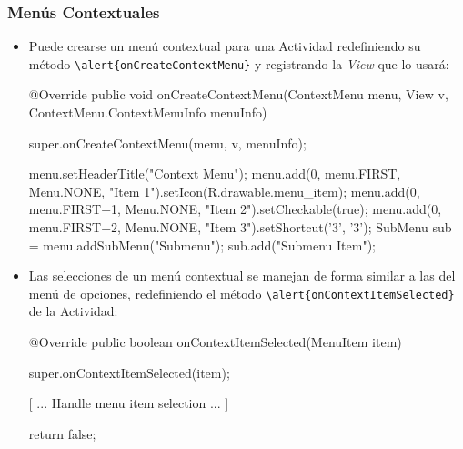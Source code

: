 \documentclass[hyperref={pdfpagelabels=true},ucs]{beamer}
\begin{document}
\begin{frame}[fragile, shrink=23]
\frametitle{Menús Contextuales}

\begin{itemize}

\item Puede crearse un menú contextual para una Actividad redefiniendo
  su método \Verb|\alert{onCreateContextMenu}| y registrando la
  \emph{View} que lo usará:

\begin{tiny}
\begin{block}{}
\begin{java}
@Override
public void onCreateContextMenu(ContextMenu menu, View v,
                                ContextMenu.ContextMenuInfo menuInfo) {
  super.onCreateContextMenu(menu, v, menuInfo);

  menu.setHeaderTitle("Context Menu");
  menu.add(0, menu.FIRST, Menu.NONE,
           "Item 1").setIcon(R.drawable.menu_item);
  menu.add(0, menu.FIRST+1, Menu.NONE, "Item 2").setCheckable(true);
  menu.add(0, menu.FIRST+2, Menu.NONE, "Item 3").setShortcut('3', '3');
  SubMenu sub = menu.addSubMenu("Submenu");
  sub.add("Submenu Item");
}
\end{java}
\end{block}
\end{tiny}

\item Las selecciones de un menú contextual se manejan de forma
  similar a las del menú de opciones, redefiniendo el método
  \Verb|\alert{onContextItemSelected}| de la Actividad:

\begin{tiny}
\begin{block}{}
\begin{java}
@Override
public boolean onContextItemSelected(MenuItem item) {
  super.onContextItemSelected(item);

  [ ... Handle menu item selection ... ]

  return false;
}
\end{java}
\end{block}
\end{tiny}


\end{itemize}


\end{frame}
\end{document}
